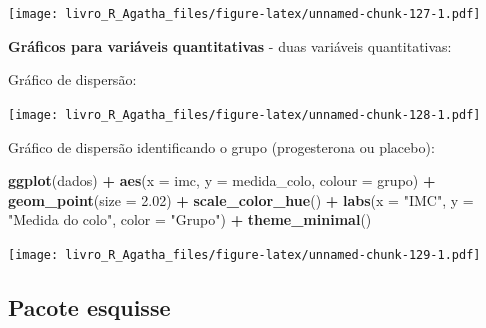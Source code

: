 \documentclass[
]{book}
\newenvironment{Shaded}{\begin{snugshade}}{\end{snugshade}}
\newcommand{\DataTypeTok}[1]{\textcolor[rgb]{0.13,0.29,0.53}{#1}}
\newcommand{\FloatTok}[1]{\textcolor[rgb]{0.00,0.00,0.81}{#1}}
\newcommand{\KeywordTok}[1]{\textcolor[rgb]{0.13,0.29,0.53}{\textbf{#1}}}
\newcommand{\NormalTok}[1]{#1}
\newcommand{\OperatorTok}[1]{\textcolor[rgb]{0.81,0.36,0.00}{\textbf{#1}}}
\newcommand{\StringTok}[1]{\textcolor[rgb]{0.31,0.60,0.02}{#1}}
\begin{document}
\texttt{[image: livro\_R\_Agatha\_files/figure-latex/unnamed-chunk-127-1.pdf]}

\textbf{Gráficos para variáveis quantitativas} - duas variáveis quantitativas:

Gráfico de dispersão:

\begin{Shaded}
\end{Shaded}

\texttt{[image: livro\_R\_Agatha\_files/figure-latex/unnamed-chunk-128-1.pdf]}

Gráfico de dispersão identificando o grupo (progesterona ou placebo):

\begin{Shaded}
\begin{Highlighting}[]
\KeywordTok{ggplot}\NormalTok{(dados) }\OperatorTok{+}
\StringTok{  }\KeywordTok{aes}\NormalTok{(}\DataTypeTok{x =}\NormalTok{ imc, }\DataTypeTok{y =}\NormalTok{ medida_colo, }\DataTypeTok{colour =}\NormalTok{ grupo) }\OperatorTok{+}
\StringTok{  }\KeywordTok{geom_point}\NormalTok{(}\DataTypeTok{size =} \FloatTok{2.02}\NormalTok{) }\OperatorTok{+}
\StringTok{  }\KeywordTok{scale_color_hue}\NormalTok{() }\OperatorTok{+}
\StringTok{  }\KeywordTok{labs}\NormalTok{(}\DataTypeTok{x =} \StringTok{"IMC"}\NormalTok{, }\DataTypeTok{y =} \StringTok{"Medida do colo"}\NormalTok{, }\DataTypeTok{color =} \StringTok{"Grupo"}\NormalTok{) }\OperatorTok{+}
\StringTok{  }\KeywordTok{theme_minimal}\NormalTok{()}
\end{Highlighting}
\end{Shaded}

\texttt{[image: livro\_R\_Agatha\_files/figure-latex/unnamed-chunk-129-1.pdf]}

\hypertarget{pacote-esquisse}{%
\subsection{Pacote esquisse}\label{pacote-esquisse}}
\end{document}
